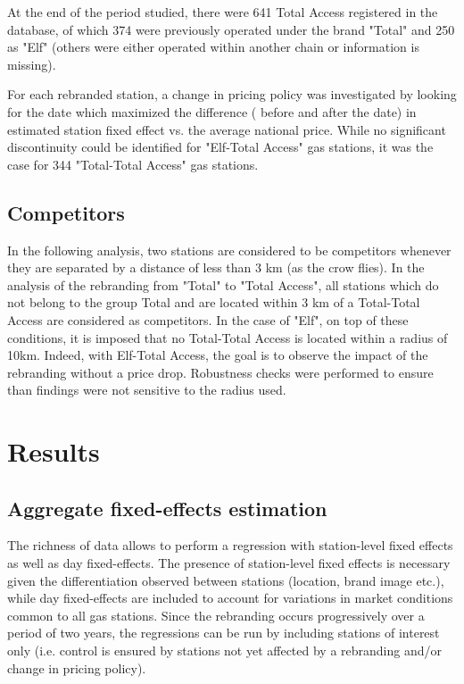 \documentclass[11pt]{article}
\begin{document}
At the end of the period studied, there were 641 Total Access registered in the database, of which 374 were previously operated under the brand "Total" and 250 as "Elf" (others were either operated within another chain or information is missing). 

For each rebranded station, a change in pricing policy was investigated by looking for the date which maximized the difference ( before and after the date) in estimated station fixed effect vs. the average national price. While no significant discontinuity could be identified for "Elf-Total Access" gas stations, it was the case for 344 "Total-Total Access" gas stations.

\subsection{Competitors}

In the following analysis, two stations are considered to be competitors whenever they are separated by a distance of less than 3 km (as the crow flies). In the analysis of the rebranding from "Total" to "Total Access", all stations which do not belong to the group Total and are located within 3 km of a Total-Total Access are considered as competitors. In the case of "Elf", on top of these conditions, it is imposed that no Total-Total Access is located within a radius of 10km. Indeed, with Elf-Total Access, the goal is to observe the impact of the rebranding without a price drop. Robustness checks were performed to ensure than findings were not sensitive to the radius used.

\section{Results}

\subsection{Aggregate fixed-effects estimation}

The richness of data allows to perform a regression with station-level fixed effects as well as day fixed-effects. The presence of station-level fixed effects is necessary given the differentiation observed between stations (location, brand image etc.), while day fixed-effects are included to account for variations in market conditions common to all gas stations. Since the rebranding occurs progressively over a period of two years, the regressions can be run by including stations of interest only (i.e. control is ensured by stations not yet affected by a rebranding and/or change in pricing policy).
\end{document}
